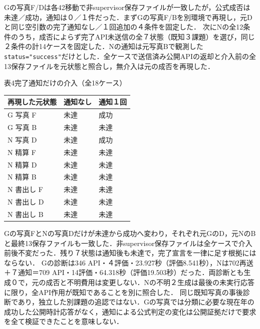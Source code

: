 Gの写真F/Dは各42移動で非supervisor保存ファイルが一致したが，公式成否は未達／成功，通知は０／１件だった．まずGの写真F/Bを別環境で再現し，元Dと同じ空引数の完了通知なし／１回追加の４条件を固定した．
次にNの全12条件のうち，成否によらず完了API未送信の全７状態（既知３課題）を選び，同じ２条件の計14ケースを固定した．Nの通知は元写真Bで観測した\texttt{status="success"}だけとした．全ケースで送信済み公開APIの返却と介入前の全13保存ファイルを元状態と照合し，無介入は元の成否を再現した．
\begin{center}\small 表4\quad 完了通知だけの介入（全18ケース）\par\smallskip
\begin{tabular}{lll}\hline 再現した元状態 & 通知なし & 通知１回\\\hline
G 写真 F & 未達 & 成功\\
G 写真 B & 未達 & 未達\\
N 写真 D & 未達 & 成功\\
N 精算 F & 未達 & 未達\\
N 精算 D & 未達 & 未達\\
N 精算 B & 未達 & 未達\\
N 書出し F & 未達 & 未達\\
N 書出し D & 未達 & 未達\\
N 書出し B & 未達 & 未達\\
\hline\end{tabular}\end{center}
Gの写真FとNの写真Dだけが未達から成功へ変わり，それぞれ元GのD，元NのBと最終13保存ファイルも一致した．非supervisor保存ファイルは全ケースで介入前後不変だった．残り７状態は通知後も未達で，完了宣言を一律に足す根拠にはならない．
Gの診断は346 API・４評価・23.927秒（評価8.541秒），Nは702再送＋７通知＝709 API・14評価・64.318秒（評価19.503秒）だった．両診断とも生成０で，元の成否と不明費用は変更しない．Nの不明２生成は最後の未実行応答に限り，全API作用が既知であることを別に照合した．
同じ既知写真の事後診断であり，独立した別課題の追認ではない．Gの写真では分類に必要な現在年の成功した公開時計応答がなく，通知による公式判定の変化は公開証拠だけで要求を全て検証できたことを意味しない．
